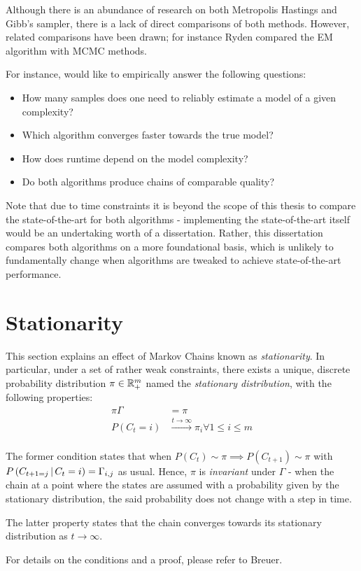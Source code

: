 Although there is an abundance of research on both Metropolis Hastings and Gibb's sampler, there is a lack of direct comparisons of both methods. However, related comparisons have been drawn; for instance Ryden\cite{ryden} compared the EM algorithm with MCMC methods. 

For instance, would like to empirically answer the following questions:
\begin{itemize}
	\item How many samples does one need to reliably estimate a model of a given complexity?
	\item Which algorithm converges faster towards the true model?
	\item How does runtime depend on the model complexity?
	\item Do both algorithms produce chains of comparable quality?
\end{itemize}

Note that due to time constraints it is beyond the scope of this thesis to compare the state-of-the-art for both algorithms - implementing the state-of-the-art itself would be an undertaking worth of a dissertation. Rather, this dissertation compares both algorithms on a more foundational basis, which is unlikely to fundamentally change when algorithms are tweaked to achieve state-of-the-art performance. 



\section{Stationarity}
This section explains an effect of Markov Chains known as \textit{stationarity}. In particular, under a set of rather weak constraints, there exists a unique, discrete probability distribution $\pi \in \mathbb{R}_+^m$ named the \textit{stationary distribution}, with the following properties:
\begin{align*}
	\pi \Gamma &= \pi \\
	P(C_t = i) &\overset{t \rightarrow \infty}{\longrightarrow} \pi_i \forall 1 \leq i \leq m \\
\end{align*}

The former condition states that when $P(C_t) \sim \pi \implies P(C_{t+1}) \sim \pi$ with $P\left(C_{t+1 = j} \, | \, C_t = i\right) = \Gamma_{i, j}$ as usual. Hence, $\pi$ is \textit{invariant} under $\Gamma$ - when the chain at a point where the states are assumed with a probability given by the stationary distribution, the said probability does not change with a step in time. 

The latter property states that the chain converges towards its stationary distribution as $t \rightarrow \infty$. 

For details on the conditions and a proof, please refer to Breuer\cite{intro_processes}.
